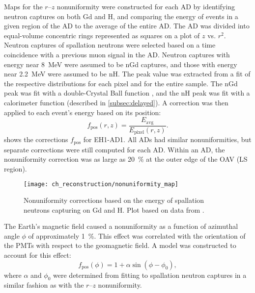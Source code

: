 Maps for the $r$--$z$ nonuniformity were constructed for each AD
by identifying neutron captures on both Gd and H,
and comparing the energy of events in a given region of the AD
to the average of the entire AD.
The AD was divided into equal-volume concentric rings
represented as squares on a plot of $z$ vs. $r^2$.
Neutron captures of spallation neutrons were selected
based on a time coincidence with a previous muon signal in the AD.
Neutron captures with energy near \SI{8}{\MeV} were assumed to be nGd captures,
and those with energy near \SI{2.2}{\MeV} were assumed to be nH.
The peak value was extracted from a fit of the respective distributions
for each pixel and for the entire sample.
The nGd peak was fit with a double-Crystal Ball function \cite{cbfunction},
and the nH peak was fit with a calorimeter function \cite{calorimeter2016}
(described in \cref{subsec:delayed}).
A correction was then applied to each event's energy based on its position:
\begin{equation}
    f_{\text{pos}}(r, z) = \frac{E_{\text{avg}}}{E_{\text{pixel}}(r,z)}.
\end{equation}
 shows the corrections $f_{\text{pos}}$ for EH1-AD1.
All ADs had similar nonuniformities, but separate corrections were still computed
for each AD.
Within an AD, the nonuniformity correction was as large as \SI{20}{\percent}
at the outer edge of the OAV (LS region).

\begin{figure}
    \centering
    \texttt{[image: ch\_reconstruction/nonuniformity\_map]}
    \caption{
        Nonuniformity corrections based on the energy of spallation neutrons
        capturing on Gd and H.
        Plot based on data from \cite{nonuniformity2}.
    }
    \label{fig:nonuniformity_map}
\end{figure}

The Earth's magnetic field caused a nonuniformity
as a function of azimuthal angle $\phi$ of approximately \SI{1}{\percent}.
This effect was correlated with the orientation of the PMTs with respect
to the geomagnetic field.
A model was constructed to account for this effect:
\begin{equation}
    f_{\text{pos}}(\phi) = 1 + \alpha\sin(\phi-\phi_0),
\end{equation}
where $\alpha$ and $\phi_0$ were determined from fitting to spallation neutron captures
in a similar fashion as with the $r$--$z$ nonuniformity.

